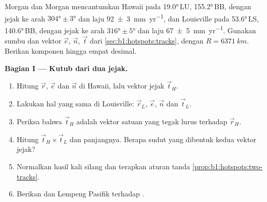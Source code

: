 \begin{problem}
\label{pb:b1:hotspots:1}
Morgan dan Morgan mencantumkan  Hawaii pada \ang{19.0}\,LU, \ang{155.2}\,BB, dengan jejak ke arah $\ang{304}\pm\ang{3}$ dan laju \qty[uncertainty-mode=separate]{92 \pm 3}{mm.yr^{-1}}, dan  Louisville pada \ang{53.6}\,LS, \ang{140.6}\,BB, dengan jejak ke arah $\ang{316}\pm\ang{5}$ dan laju \qty[uncertainty-mode=separate]{67 \pm 5}{mm.yr^{-1}}. Gunakan sumbu dan vektor $\vec e$, $\vec n$, $\vec t$ dari \cref{sec:b1:hotspots:tracks}, dengan $R = \qty{6371}{km}$. Berikan komponen hingga empat desimal.

\medskip
\noindent\textbf{Bagian I --- Kutub dari dua jejak.}
\begin{enumerate}
  \item Hitung $\vec r$, $\vec e$ dan $\vec n$ di Hawaii, lalu vektor jejak $\vec t_H$.
  \item Lakukan hal yang sama di Louisville: $\vec r_L$, $\vec e$, $\vec n$ dan $\vec t_L$.
  \item Periksa bahwa $\vec t_H$ adalah vektor satuan yang tegak lurus terhadap $\vec r_H$.
  \item Hitung $\vec t_H\times\vec t_L$ dan panjangnya. Berapa sudut yang dibentuk kedua vektor jejak?
  \item Normalkan hasil kali silang dan terapkan aturan tanda \cref{prop:b1:hotspots:two-tracks}.
  \item Berikan  dan   Lempeng Pasifik terhadap .
\end{enumerate}


\end{problem}
